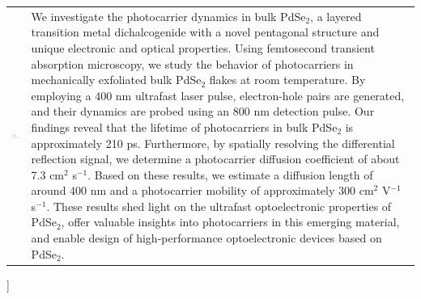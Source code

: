 \documentclass[twoside,twocolumn,9pt]{article}
\begin{document}
\begin{@twocolumnfalse}
\begin{tabular}{m{4.5cm} p{13.5cm} }
\includegraphics{head_foot/dates} & \noindent\normalsize{We investigate the photocarrier dynamics in bulk PdSe$_2$, a layered transition metal dichalcogenide with a novel pentagonal structure and unique electronic and optical properties. Using femtosecond transient absorption microscopy, we study the behavior of photocarriers in mechanically exfoliated bulk PdSe$_2$ flakes at room temperature. By employing a 400 nm ultrafast laser pulse, electron-hole pairs are generated, and their dynamics are probed using an 800 nm detection pulse. Our findings reveal that the lifetime of photocarriers in bulk PdSe$_2$ is approximately 210 ps. Furthermore, by spatially resolving the differential reflection signal, we determine a photocarrier diffusion coefficient of about 7.3 cm$^{2}$ s$^{-1}$. Based on these results, we estimate a diffusion length of around 400 nm and a photocarrier mobility of approximately 300 cm$^{2}$ V$^{-1}$ s$^{-1}$. These results shed light on the ultrafast optoelectronic properties of PdSe$_2$, offer valuable insights into photocarriers in this emerging material, and enable design of high-performance optoelectronic devices based on PdSe$_2$. } \\%

\end{tabular}

 \end{@twocolumnfalse} \vspace{0.6cm}

  ]

\renewcommand*\rmdefault{bch}\normalfont\upshape
\rmfamily
\section*{}
\vspace{-1cm}



\end{document}
